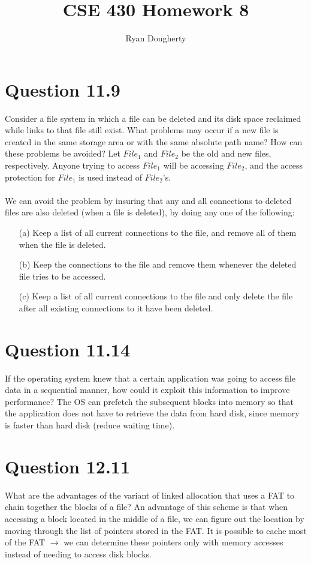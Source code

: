 \documentclass[12pt]{article}
\title{CSE 430 Homework 8}
\author{Ryan Dougherty}
\date{}                                           %
\begin{document}
\maketitle

\section*{Question 11.9} {\color{blue} Consider a file system in which a file can be deleted and its disk space reclaimed while links to that file still exist. What problems may occur if a new file is created in the same storage area or with the same absolute path name? How can these problems be avoided?
} Let $File_{1}$ and $File_{2}$ be the old and new files, respectively. Anyone trying to access $File_{1}$ will be accessing $File_{2}$, and the access protection for $File_{1}$ is used instead of $File_{2}$'s.
\\ \\
We can avoid the problem by insuring that any and all connections to deleted files are also deleted (when a file is deleted), by doing any one of the following:
\begin{enumerate}
\item[(a)]Keep a list of all current connections to the file, and remove all of them when the file is deleted.
\item[(b)]Keep the connections to the file and remove them whenever the deleted file tries to be accessed.
\item[(c)]Keep a list of all current connections to the file and only delete the file after all existing connections to it have been deleted.
\end{enumerate}

\section*{Question 11.14} {\color{blue} If the operating system knew that a certain application was going to access file data in a sequential manner, how could it exploit this information to improve performance?} 
The OS can prefetch the subsequent blocks into memory so that the application does not have to retrieve the data from hard disk, since memory is faster than hard disk (reduce waiting time).

\section*{Question 12.11} {\color{blue} What are the advantages of the variant of linked allocation that uses a FAT to chain together the blocks of a file?} 
An advantage of this scheme is that when accessing a block located in the middle of a file, we can figure out the location by moving through the list of pointers stored in the FAT. It is possible to cache most of the FAT $\rightarrow$ we can determine these pointers only with memory accesses instead of needing to access disk blocks.
\end{document}

